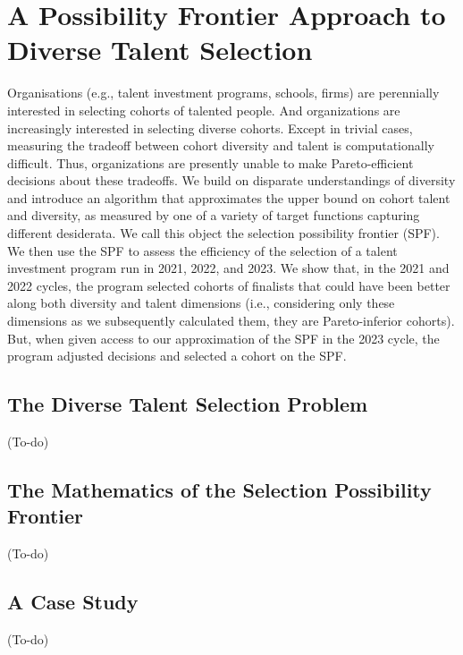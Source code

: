

\chapter{\label{ch:spf}A Possibility Frontier Approach to Diverse Talent Selection} %

\minitoc

Organisations (e.g., talent investment programs, schools, firms) are perennially interested in selecting cohorts of talented people. And organizations are increasingly interested in selecting diverse cohorts. Except in trivial cases, measuring the tradeoff between cohort diversity and talent is computationally difficult. Thus, organizations are presently unable to make Pareto-efficient decisions about these tradeoffs. We build on disparate understandings of diversity and introduce an algorithm that approximates the upper bound on cohort talent and diversity, as measured by one of a variety of target functions capturing different desiderata. We call this object the selection possibility frontier (SPF). We then use the SPF to assess the efficiency of the selection of a talent investment program run in 2021, 2022, and 2023. We show that, in the 2021 and 2022 cycles, the program selected cohorts of finalists that could have been better along both diversity and talent dimensions (i.e., considering only these dimensions as we subsequently calculated them, they are Pareto-inferior cohorts). But, when given access to our approximation of the SPF in the 2023 cycle, the program adjusted decisions and selected a cohort on the SPF.

\section{The Diverse Talent Selection Problem}
(To-do)

\section{The Mathematics of the Selection Possibility Frontier}
(To-do)

\section{A Case Study}
(To-do)